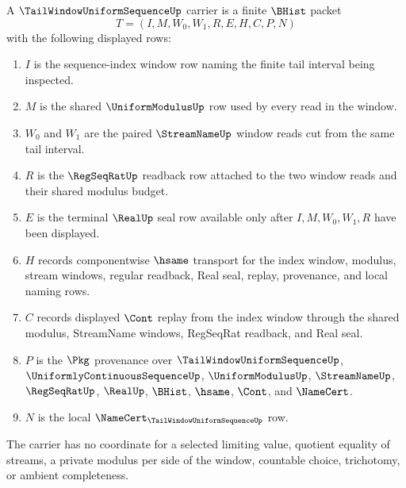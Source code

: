 \begin{definition}
\label{def:tail-window-uniform-sequence-carrier}
A $\TailWindowUniformSequenceUp$ carrier is a finite $\BHist$ packet
$$
T=(I,M,W_0,W_1,R,E,H,C,P,N)
$$
with the following displayed rows:
\begin{enumerate}
\item $I$ is the sequence-index window row naming the finite tail interval being inspected.
\item $M$ is the shared $\UniformModulusUp$ row used by every read in the window.
\item $W_0$ and $W_1$ are the paired $\StreamNameUp$ window reads cut from the same tail interval.
\item $R$ is the $\RegSeqRatUp$ readback row attached to the two window reads and their shared modulus budget.
\item $E$ is the terminal $\RealUp$ seal row available only after $I,M,W_0,W_1,R$ have been displayed.
\item $H$ records componentwise $\hsame$ transport for the index window, modulus, stream windows, regular readback, Real seal, replay, provenance, and local naming rows.
\item $C$ records displayed $\Cont$ replay from the index window through the shared modulus, StreamName windows, RegSeqRat readback, and Real seal.
\item $P$ is the $\Pkg$ provenance over $\TailWindowUniformSequenceUp$, $\UniformlyContinuousSequenceUp$, $\UniformModulusUp$, $\StreamNameUp$, $\RegSeqRatUp$, $\RealUp$, $\BHist$, $\hsame$, $\Cont$, and $\NameCert$.
\item $N$ is the local $\NameCert_{\TailWindowUniformSequenceUp}$ row.
\end{enumerate}
The carrier has no coordinate for a selected limiting value, quotient equality of streams, a private modulus per side of the window, countable choice, trichotomy, or ambient completeness.
\end{definition}

